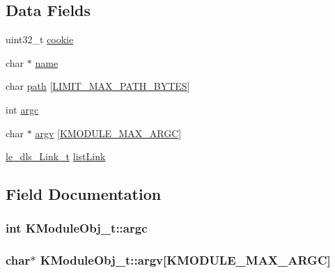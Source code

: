 \subsection*{Data Fields}
\begin{DoxyCompactItemize}
\item 
uint32\+\_\+t \hyperlink{struct_k_module_obj__t_a2a7109841c4adc4c314cda336f8f0f41}{cookie}
\item 
char $\ast$ \hyperlink{struct_k_module_obj__t_a44c69d8387422def8b01c0783efbdfef}{name}
\item 
char \hyperlink{struct_k_module_obj__t_a6c6bc990ad9809c6ce6c85fe8db8df5e}{path} \mbox{[}\hyperlink{limit_8h_accd19a6264ef965c02f113dc01610e14}{L\+I\+M\+I\+T\+\_\+\+M\+A\+X\+\_\+\+P\+A\+T\+H\+\_\+\+B\+Y\+T\+ES}\mbox{]}
\item 
int \hyperlink{struct_k_module_obj__t_ae1b7160f25a22f5ceada08f45b1e3fcc}{argc}
\item 
char $\ast$ \hyperlink{struct_k_module_obj__t_a92fcf8a56a7e7c8ce233f382c5c00f85}{argv} \mbox{[}\hyperlink{kernel_modules_8c_a7023d08193fecf5c4ceecdbb2f0ee3a1}{K\+M\+O\+D\+U\+L\+E\+\_\+\+M\+A\+X\+\_\+\+A\+R\+GC}\mbox{]}
\item 
\hyperlink{structle__dls___link__t}{le\+\_\+dls\+\_\+\+Link\+\_\+t} \hyperlink{struct_k_module_obj__t_aacdf65672ea6e9b159c4f5fef124d05a}{list\+Link}
\end{DoxyCompactItemize}


\subsection{Field Documentation}
\subsubsection[{\texorpdfstring{argc}{argc}}]{\setlength{\rightskip}{0pt plus 5cm}int K\+Module\+Obj\+\_\+t\+::argc}\hypertarget{struct_k_module_obj__t_ae1b7160f25a22f5ceada08f45b1e3fcc}{}\label{struct_k_module_obj__t_ae1b7160f25a22f5ceada08f45b1e3fcc}
\subsubsection[{\texorpdfstring{argv}{argv}}]{\setlength{\rightskip}{0pt plus 5cm}char$\ast$ K\+Module\+Obj\+\_\+t\+::argv\mbox{[}{\bf K\+M\+O\+D\+U\+L\+E\+\_\+\+M\+A\+X\+\_\+\+A\+R\+GC}\mbox{]}}\hypertarget{struct_k_module_obj__t_a92fcf8a56a7e7c8ce233f382c5c00f85}{}\label{struct_k_module_obj__t_a92fcf8a56a7e7c8ce233f382c5c00f85}
